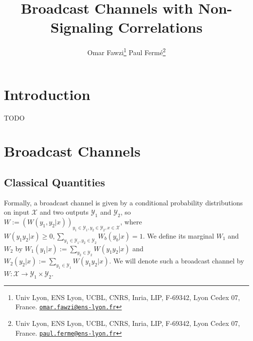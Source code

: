 \documentclass[11pt]{article}
\title{\bfseries Broadcast Channels with Non-Signaling Correlations}
\author{Omar Fawzi\footnote{Univ Lyon, ENS Lyon, UCBL, CNRS, Inria,  LIP, F-69342, Lyon Cedex 07, France. \href{mailto:omar.fawzi@ens-lyon.fr}{\texttt{omar.fawzi@ens-lyon.fr}}} \qquad Paul Fermé\footnote{Univ Lyon, ENS Lyon, UCBL, CNRS, Inria, LIP, F-69342, Lyon Cedex 07, France. \href{mailto:paul.ferme@ens-lyon.fr}{\texttt{paul.ferme@ens-lyon.fr}}}
}
\date{}
\theoremstyle{definition}
\theoremstyle{remark}
\begin{document}
\maketitle

\section{Introduction}
TODO

\section{Broadcast Channels}
\subsection{Classical Quantities}
Formally, a broadcast channel is given by a conditional probability distributions on input $\mathcal{X}$ and two outputs $\mathcal{Y}_1$ and $\mathcal{Y}_2$, so $W := \left(W(y_1,y_2|x)\right)_{y_1 \in \mathcal{Y}_1, y_2 \in \mathcal{Y}_2, x \in \mathcal{X}}$, where $W(y_1y_2|x) \geq 0, \sum_{y_1 \in \mathcal{Y}_1, y_2 \in \mathcal{Y}_2} W_b(y_b|x) = 1$. We define its marginal $W_1$ and $W_2$ by $W_1(y_1|x) := \sum_{y_2 \in \mathcal{Y}_2} W(y_1y_2|x)$ and $W_2(y_2|x) := \sum_{y_1 \in \mathcal{Y}_1} W(y_1y_2|x)$. We will denote such a broadcast channel by $W : \mathcal{X} \rightarrow \mathcal{Y}_1 \times \mathcal{Y}_2$.
\end{document}
